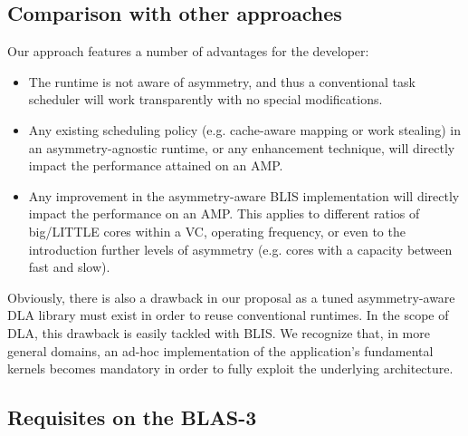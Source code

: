 \subsection{Comparison with other approaches}

Our approach features a number of advantages for the developer:
\begin{itemize}
\item The runtime is not aware of asymmetry, and thus a conventional task scheduler 
      will work transparently with no special modifications.
\item Any existing scheduling policy (e.g. cache-aware mapping or work stealing)
      in an asymmetry-agnostic runtime, or any enhancement technique, will directly impact the performance attained on an AMP.
\item Any improvement in the asymmetry-aware BLIS implementation will directly impact the performance on an AMP. 
      This applies to different ratios of big/LITTLE cores within a VC, operating frequency, or even to the introduction further levels
      of asymmetry (e.g. cores with a capacity between fast and slow).
\end{itemize}

Obviously, there is also a drawback in our proposal
as a tuned asymmetry-aware DLA library must exist in order to 
reuse conventional runtimes. 
In the scope of DLA, this drawback is easily tackled with BLIS. We recognize that, in more general domains, 
an ad-hoc implementation of the application's 
fundamental kernels becomes mandatory in order to fully exploit the underlying architecture.


\subsection{Requisites on the BLAS-3}

